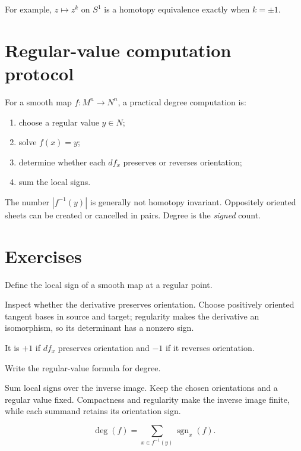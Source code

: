For example, \(z\mapsto z^k\) on \(S^1\) is a homotopy equivalence exactly when
\(k=\pm1\).

\section{Regular-value computation protocol}

For a smooth map \(f:M^n\to N^n\), a practical degree computation is:

\begin{enumerate}
\item choose a regular value \(y\in N\);
\item solve \(f(x)=y\);
\item determine whether each \(df_x\) preserves or reverses orientation;
\item sum the local signs.
\end{enumerate}

\begin{warning}
\label{warn:viii03-unsigned}
The number \(|f^{-1}(y)|\) is generally not homotopy invariant.  Oppositely
oriented sheets can be created or cancelled in pairs.  Degree is the
\emph{signed} count.
\end{warning}

\section{Exercises}

\begin{exercise}\label{exr:viii03-01}
Define the local sign of a smooth map at a regular point.
\end{exercise}
\begin{hint}Inspect whether the derivative preserves orientation.
Choose positively oriented tangent bases in source and target; regularity makes the derivative an isomorphism, so its determinant has a nonzero sign.
\end{hint}
\begin{solution}
It is \(+1\) if \(df_x\) preserves orientation and \(-1\) if it reverses orientation.
\end{solution}

\begin{exercise}\label{exr:viii03-02}
Write the regular-value formula for degree.
\end{exercise}
\begin{hint}Sum local signs over the inverse image.
Keep the chosen orientations and a regular value fixed. Compactness and regularity make the inverse image finite, while each summand retains its orientation sign.
\end{hint}
\begin{solution}
\[
\deg(f)=\sum_{x\in f^{-1}(y)}\operatorname{sgn}_x(f).
\]
\end{solution}

